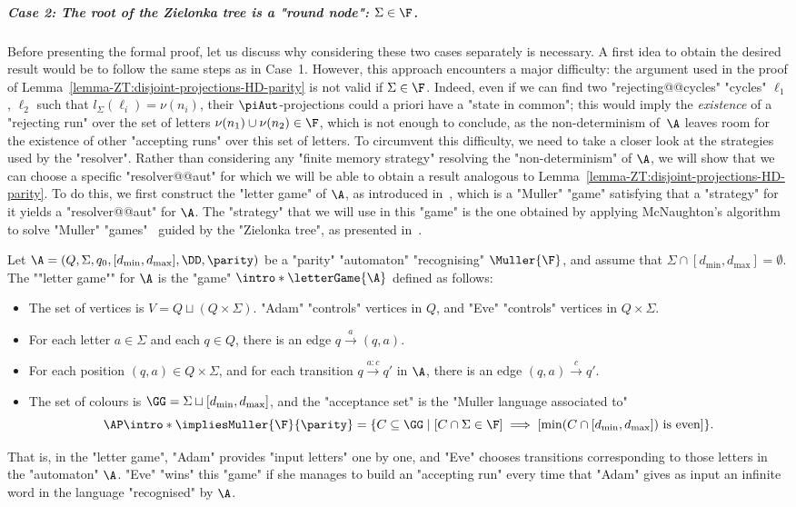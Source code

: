 \documentclass[10pt,a4paper]{amsart}
\renewcommand{\SS}{\Sigma}
\newcommand{\re}[1]{\xrightarrow{#1}}
\begin{document}
\subparagraph*{Case 2: The root of the Zielonka tree is a "round node": $\SS\in \F$.}
Before presenting the formal proof, let us discuss why considering these two cases separately is necessary. A first idea to obtain the desired result would be to follow the same steps as in Case~1. However, this approach encounters a major difficulty: the argument used in the proof of Lemma~\ref{lemma-ZT:disjoint-projections-HD-parity} is not valid if $\SS\in \F$. Indeed, even if we can find two "rejecting@@cycles" "cycles" $\ell_1$, $\ell_2$ such that $l_\SS(\ell_i) = \nu(n_i)$, their $\piAut$-projections could a priori have a "state in common"; this would imply the \emph{existence} of a "rejecting run" over the set of letters $\nu(n_1)\cup \nu(n_2)\in \F$, which is not enough to conclude, as the non-determinism of~$\A$ leaves room for the existence of other "accepting runs" over this set of letters. 
To circumvent this difficulty, we need to take a closer look at the strategies used by the "resolver". Rather than considering any "finite memory strategy" resolving the "non-determinism" of $\A$, we will show that we can choose a specific "resolver@@aut" for which we will be able to obtain a result analogous to Lemma~\ref{lemma-ZT:disjoint-projections-HD-parity}. 
To do this, we first construct the "letter game" of $\A$, as introduced in~\cite{HP06}, which is a "Muller" "game" satisfying that a "strategy" for it yields a "resolver@@aut" for $\A$.
The "strategy" that we will use in this "game" is the one obtained by applying McNaughton's algorithm to solve "Muller" "games"~\cite{McNaughton93InfiniteGames} guided by the "Zielonka tree", as presented in~\cite{DJW1997memory}.



Let $\A = (Q,\Sigma, q_0, [d_{\min}, d_{\max}], \DD, \parity)$ be a "parity" "automaton" "recognising" $\Muller{\F}$, and assume that $\SS\cap [d_{\min}, d_{\max}] = \emptyset$.
\AP The ""letter game"" for $\A$ is the "game" $\intro*\letterGame{\A}$ defined as follows:
\begin{itemize}
	\item The set of vertices is $V = Q\sqcup (Q\times \SS)$. "Adam" "controls" vertices in $Q$, and "Eve" "controls" vertices in $Q\times \SS$.
	\item For each letter $a\in \SS$ and each $q\in Q$, there is an edge $q\re{a} (q,a)$.
	\item For each position $(q,a)\in Q\times \SS$, and for each transition $q\re{a:c}q'$ in $\A$, there is an edge $(q,a)\re{c} q'$.
	\item The set of colours is $\GG = \SS\sqcup [d_{\min}, d_{\max}]$, and the "acceptance set" is the "Muller language associated to"
	\[\AP \intro*\impliesMuller{\F}{\parity} = \{ C \subseteq \GG \mid  [C\cap \SS \in \F] \implies [\min (C\cap [d_{\min}, d_{\max}]) \text{ is even}] \}.  \]
\end{itemize}
That is, in the "letter game", "Adam" provides "input letters" one by one, and "Eve" chooses transitions corresponding to those letters in the "automaton" $\A$. "Eve" "wins" this "game" if she manages to build an "accepting run" every time that "Adam" gives as input an infinite word in the language "recognised" by $\A$.
\end{document}
